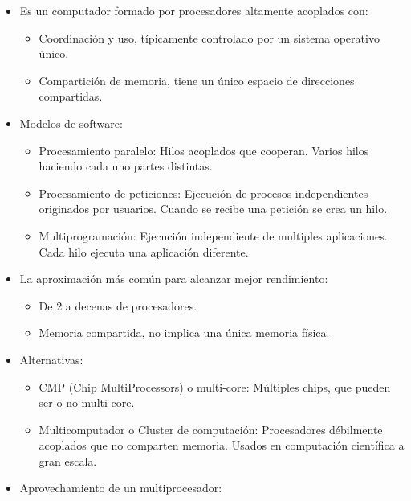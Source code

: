 \documentclass[12pt, twoside, openright]{report} %
\begin{document}
    \begin{itemize}
    \item
      Es un computador formado por procesadores altamente acoplados
      con:

      \begin{itemize}
      
      \item
        Coordinación y uso, típicamente controlado por un sistema
        operativo único.
      \item
        Compartición de memoria, tiene un único espacio de direcciones
        compartidas.
      \end{itemize}
    \item
      Modelos de software:

      \begin{itemize}
      
      \item
        Procesamiento paralelo: Hilos acoplados que cooperan. Varios
        hilos haciendo cada uno partes distintas.
      \item
        Procesamiento de peticiones: Ejecución de procesos
        independientes originados por usuarios. Cuando se recibe una
        petición se crea un hilo.
      \item
        Multiprogramación: Ejecución independiente de multiples
        aplicaciones. Cada hilo ejecuta una aplicación diferente.
      \end{itemize}
      \pagebreak
    \item
      La aproximación más común para alcanzar mejor rendimiento:

      \begin{itemize}
      
      \item
        De 2 a decenas de procesadores.
      \item
        Memoria compartida, no implica una única memoria física.
      \end{itemize}
    \item
      Alternativas:

      \begin{itemize}
      
      \item
        CMP (Chip MultiProcessors) o multi-core: Múltiples chips, que
        pueden ser o no multi-core.
      \item
        Multicomputador o Cluster de computación: Procesadores
        débilmente acoplados que no comparten memoria. Usados en
        computación científica a gran escala.
      \end{itemize}
    \item
      Aprovechamiento de un multiprocesador:


\end{itemize}
\end{document}
